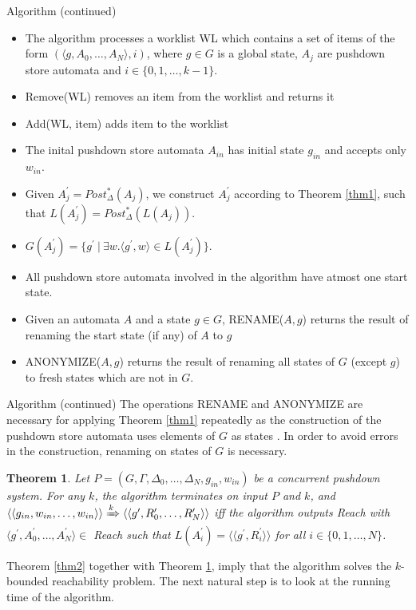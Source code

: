 \documentclass[10pt,notheorems]{beamer}
\theoremstyle{plain} %
\newtheorem{theorem}{Theorem}
\begin{document}
\begin{frame}{Algorithm (continued)}
    \begin{itemize}
        \item The algorithm processes a worklist WL which contains a set of items of the form 
        $(\langle g, A_0,\dots, A_N\rangle,i)$, where $g\in G$ is a global state, $A_j$ are pushdown store automata and $i\in\{0,1,\dots,k-1\}$. 
        \item Remove(WL) removes an item from the worklist and returns it
        \item Add(WL, item) adds item to the worklist 
        \item The inital pushdown store automata $A_{in}$ has initial state $g_{in}$ and accepts only 
        $w_{in}$. 
        \item Given $A_j^{\prime}=Post^*_{\Delta}(A_j)$, we construct $A_j^{\prime}$ according to 
        Theorem \ref{thm1}, such that $L(A_j^{\prime})=Post^*_{\Delta}(L(A_j))$.
        \item $G(A_j^{\prime})=\{g^{\prime}\:|\:\exists w.\langle g^{\prime},w\rangle\in L(A_j^{\prime})\}$.
        \item All pushdown store automata involved in the algorithm have atmost one start state.
        \item Given an automata $A$ and a state $g\in G$, RENAME($A,g$) returns the result of renaming the start state (if any)
        of $A$ to $g$
        \item ANONYMIZE($A,g$) returns the result of renaming all states of $G$ (except $g$) to fresh states which are not in $G$.
    \end{itemize}
\end{frame}
\begin{frame}{Algorithm (continued)}
    The operations RENAME and ANONYMIZE are necessary for applying Theorem \ref{thm1} repeatedly
    as the construction of the pushdown store automata uses elements of $G$ as states \cite{schwoon2002model}. 
    In order to avoid errors in the construction, renaming on states of $G$ is necessary. 
    \begin{theorem}\label{thm3}
    Let $P=(G,\Gamma, \Delta_0,\dots,\Delta_N,g_{in},w_{in})$ be a concurrent pushdown system.
    For any $k$, the algorithm terminates on input $P$ and $k$, and 
    $\langle\langle g_{in},w_{in},\dots,w_{in}\rangle\rangle \xRightarrow{k}\langle\langle g^{\prime},R^{\prime}_0,\dots,R^{\prime}_N\rangle\rangle$
    iff the algorithm outputs Reach with $\langle g^{\prime},A^{\prime}_0,\dots,A^{\prime}_N\rangle\in$ Reach such that 
    $L(A_i^{\prime})=\langle\langle g^{\prime},R^{\prime}_i \rangle\rangle$ for all $i\in\{0,1,\dots,N\}$.
    \end{theorem}
    Theorem \ref{thm2} together with Theorem \ref{thm3}, imply that the algorithm solves the $k$-bounded reachability problem. 
    The next natural step is to look at the running time of the algorithm.
\end{frame}
\end{document}
